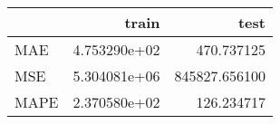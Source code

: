 \begin{tabular}{lrr}
\toprule
{} &         train &           test \\
\midrule
MAE  &  4.753290e+02 &     470.737125 \\
MSE  &  5.304081e+06 &  845827.656100 \\
MAPE &  2.370580e+02 &     126.234717 \\
\bottomrule
\end{tabular}
